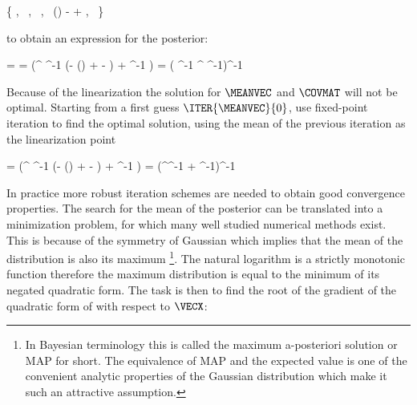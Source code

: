         \startformula
            \{ \VECA \rightarrow \MEANVECA,~
            \MATPI \rightarrow \COVMATA,~
            \MATB \rightarrow {},~
            \VECB \rightarrow \FWD()
                -  
                + \MEANVECERR,~
            \MATQI \rightarrow \COVMATERR \}
        \stopformula

        to obtain an expression for the posterior:
        
        \startformula
        \startalign[n=2,align={right,left}]
            \NC \POSTERIOR = \NC \GAUSS{\VECX}{\MEANVEC}{\COVMAT} \NR
            \NC \MEANVEC = \NC \COVMAT (^\top
                \COVMATERR^{-1} (\VECY - \FWD()
                +   - \MEANVECERR)
                + \COVMATA^{-1} \MEANVECA) \NR
            \NC \COVMAT = \NC 
                ( \COVMATERR^{-1} ^\top
                \COVMATA^{-1})^{-1} \NR
        \stopalign
        \stopformula
        
        Because of the linearization the solution for $\MEANVEC$ and $\COVMAT$
        will not be optimal. Starting from a first guess $\ITER{\MEANVEC}{0}$,
        use fixed-point iteration to find the optimal solution, using the mean
        of the previous iteration as the linearization point

        \startsubformulas[eq:gausspostiter]
        \placesubformula
        \startformula
        \startalign[n=3,align={right,left,right}]
            \NC {} = \NC
                 (^\top
                \COVMATERR^{-1} (\VECY - \FWD()
                +   - \MEANVECERR)
                + \COVMATA^{-1} \MEANVECA) \EQCOMMA \NC \NR[eq:gausspostmeaniter][a]
            \NC {} = \NC
                (^\top \COVMATERR^{-1} 
                + \COVMATA^{-1})^{-1}
                \EQSTOP \NC \NR[eq:gausspostcoviter][b]
        \stopalign
        \stopformula
        \stopsubformulas

        In practice more robust iteration schemes are needed to obtain good
        convergence properties. The search for the mean of the posterior can be
        translated into a minimization problem, for which many well studied
        numerical methods exist. This is because of the symmetry of Gaussian
        which implies that the mean of the distribution is also its maximum
        \footnote{In Bayesian terminology this is called the maximum
        a-posteriori solution or MAP for short. The equivalence of MAP and
        the expected value is one of the convenient analytic properties of
        the Gaussian distribution which make it such an attractive
        assumption.}. The natural logarithm is a strictly monotonic function
        therefore the maximum distribution is equal to the minimum of its
        negated quadratic form. The task is then to find the root of the
        gradient of the quadratic form of  with
        respect to $\VECX$:

